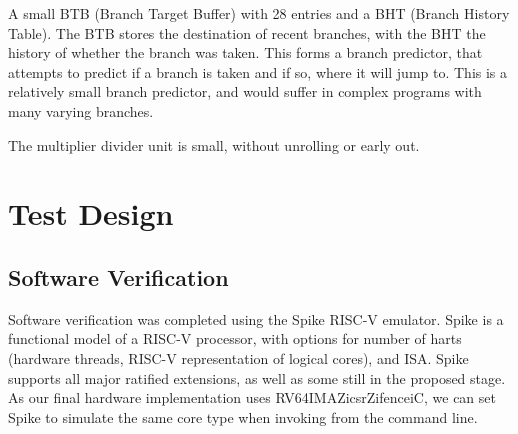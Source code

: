 A small BTB (Branch Target Buffer) with 28 entries and a BHT (Branch History Table). The BTB stores the destination of recent branches, with the BHT the history of whether the branch was taken. This forms a branch predictor, that attempts to predict if a branch is taken and if so, where it will jump to. This is a relatively small branch predictor, and would suffer in complex programs with many varying branches.

The multiplier divider unit is small, without unrolling or early out. 

\chapter{Test Design}
\label{ch:test_design}

\section{Software Verification}
Software verification was completed using the Spike RISC-V emulator. Spike is a functional model of a RISC-V processor, with options for number of harts (hardware threads, RISC-V representation of logical cores), and ISA. Spike supports all major ratified extensions, as well as some still in the proposed stage. As our final hardware implementation uses RV64IMAZicsrZifenceiC, we can set Spike to simulate the same core type when invoking from the command line.


